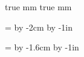 \parindent=0pt

 true mm
 true mm

\hsize=\pdfpagewidth
\advance\hsize by -2cm
\hoffset=1cm
\advance\hoffset by -1in

\vsize=\pdfpageheight
\advance\vsize by -1.6cm
\voffset=0.8cm
\advance\voffset by -1in

\def\folio{}

\font=3pt
